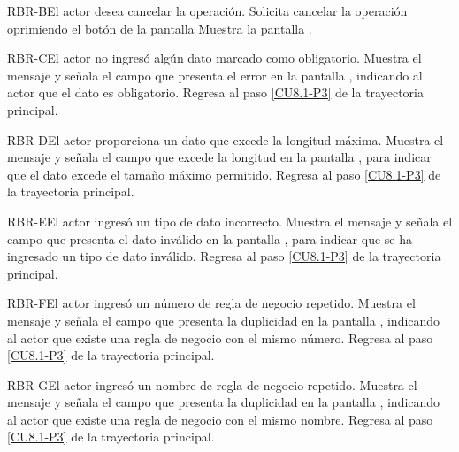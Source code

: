 	
	\begin{UCtrayectoriaA}{RBR-B}{El actor desea cancelar la operación.}
		\UCpaso[\UCactor] Solicita cancelar la operación oprimiendo el botón  de la pantalla 
		\UCpaso[\UCsist] Muestra la pantalla .
	\end{UCtrayectoriaA}

	\begin{UCtrayectoriaA}{RBR-C}{El actor no ingresó algún dato marcado como obligatorio.}
		\UCpaso[\UCsist] Muestra el mensaje  y señala el campo que presenta el error en la pantalla , indicando al actor que el dato es obligatorio.
		\UCpaso Regresa al paso \ref{CU8.1-P3} de la trayectoria principal.
	\end{UCtrayectoriaA}

	\begin{UCtrayectoriaA}{RBR-D}{El actor proporciona un dato que excede la longitud máxima.}
		\UCpaso[\UCsist] Muestra el mensaje  y señala el campo que excede la longitud en la pantalla , para indicar que el dato excede el tamaño máximo permitido.
		\UCpaso Regresa al paso \ref{CU8.1-P3} de la trayectoria principal.
	\end{UCtrayectoriaA}
	
	\begin{UCtrayectoriaA}{RBR-E}{El actor ingresó un tipo de dato incorrecto.}
		\UCpaso[\UCsist] Muestra el mensaje  y señala el campo que presenta el dato inválido en la pantalla , para indicar que se ha ingresado un tipo de dato inválido.
		\UCpaso Regresa al paso \ref{CU8.1-P3} de la trayectoria principal.
	\end{UCtrayectoriaA}

	\begin{UCtrayectoriaA}{RBR-F}{El actor ingresó un número de regla de negocio repetido.}
		\UCpaso[\UCsist] Muestra el mensaje  y señala el campo que presenta la duplicidad en
		la pantalla , indicando al actor que existe una regla de negocio con el mismo número.
		\UCpaso Regresa al paso \ref{CU8.1-P3} de la trayectoria principal.
	\end{UCtrayectoriaA}
	
	\begin{UCtrayectoriaA}{RBR-G}{El actor ingresó un nombre de regla de negocio repetido.}
		\UCpaso[\UCsist] Muestra el mensaje  y señala el campo que presenta la duplicidad en la pantalla , indicando al actor que existe una regla de negocio con el mismo nombre.
		\UCpaso Regresa al paso \ref{CU8.1-P3} de la trayectoria principal.
	\end{UCtrayectoriaA}
